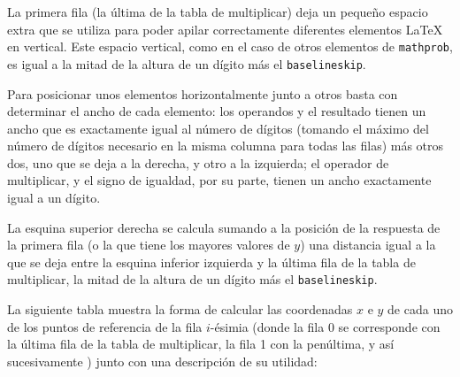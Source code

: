 \documentclass[svgnames,addpoints]{exam}
\begin{document}
La primera fila (la última de la tabla de multiplicar) deja un pequeño espacio
extra que se utiliza para poder apilar correctamente diferentes elementos
\LaTeX{} en vertical. Este espacio vertical, como en el caso de otros elementos
de \texttt{mathprob}, es igual a la mitad de la altura de un dígito más el
\texttt{baselineskip}.

Para posicionar unos elementos horizontalmente junto a otros basta con
determinar el ancho de cada elemento: los operandos y el resultado tienen un
ancho que es exactamente igual al número de dígitos (tomando el máximo del
número de dígitos necesario en la misma columna para todas las filas) más otros
dos, uno que se deja a la derecha, y otro a la izquierda; el operador de
multiplicar, y el signo de igualdad, por su parte, tienen un ancho exactamente
igual a un dígito.

La esquina superior derecha se calcula sumando a la posición de la respuesta de
la primera fila (o la que tiene los mayores valores de $y$) una distancia igual
a la que se deja entre la esquina inferior izquierda y la última fila de la
tabla de multiplicar, la mitad de la altura de un dígito más el
\texttt{baselineskip}.

La siguiente tabla muestra la forma de calcular las coordenadas $x$ e $y$ de
cada uno de los puntos de referencia de la fila $i$-ésimia (donde la fila 0 se
corresponde con la última fila de la tabla de multiplicar, la fila 1 con la
penúltima, y así sucesivamente ) junto con una descripción de su utilidad:
\end{document}
